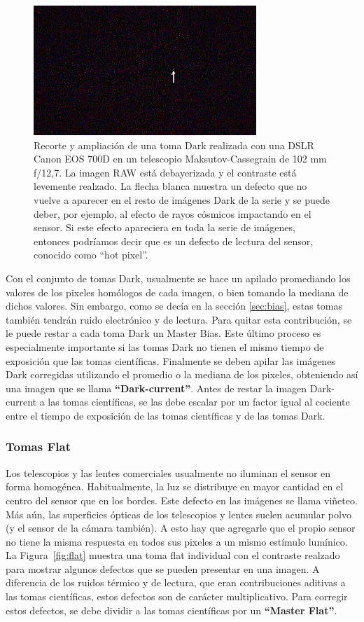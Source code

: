 \documentclass[a4paper, 12pt]{article}
\begin{document}
\begin{figure}[!ht]
  \centering
  \includegraphics[width=0.75\textwidth]{img/dark.png}
  \caption{\label{fig:dark} Recorte y ampliación de una toma Dark realizada con una DSLR Canon EOS 700D en un telescopio Maksutov-Cassegrain de 102 mm f/12,7. La imagen RAW está debayerizada y el contraste está levemente realzado. La flecha blanca muestra un defecto que no vuelve a aparecer en el resto de imágenes Dark de la serie y se puede deber, por ejemplo, al efecto de rayos cósmicos impactando en el sensor. Si este efecto apareciera en toda la serie de imágenes, entonces podríamos decir que es un defecto de lectura del sensor, conocido como ``hot pixel''.}
\end{figure}

Con el conjunto de tomas Dark, usualmente se hace un apilado promediando los valores de los pixeles homólogos de cada imagen, o bien tomando la mediana de dichos valores.  Sin embargo, como se decía en la sección \ref{sec:bias}, estas tomas también tendrán ruido electrónico y de lectura. Para quitar esta contribución, se le puede restar a cada toma Dark un Master Bias. Este último proceso es especialmente importante si las tomas Dark no tienen el mismo tiempo de exposición que las tomas científicas. Finalmente se deben apilar las imágenes Dark corregidas utilizando el promedio o la mediana de los pixeles, obteniendo así una imagen que se llama \textbf{``Dark-current''}. Antes de restar la imagen Dark-current a las tomas científicas, se las debe escalar por un factor igual al cociente entre el tiempo de exposición de las tomas científicas y de las tomas Dark.

\subsubsection{Tomas Flat}
Los telescopios y las lentes comerciales usualmente no iluminan el sensor en forma homogénea. Habitualmente, la luz se distribuye en mayor cantidad en el centro del sensor que en los bordes. Este defecto en las imágenes se llama viñeteo. Más aún, las superficies ópticas de los telescopios y lentes suelen acumular polvo (y el sensor de la cámara también). A esto hay que agregarle que el propio sensor no tiene la misma respuesta en todos sus pixeles a un mismo estímulo lumínico. 
La Figura~\ref{fig:flat} muestra una toma flat individual con el contraste realzado para mostrar algunos defectos que se pueden presentar en una imagen. A diferencia de los ruidos térmico y de lectura, que eran contribuciones aditivas a las tomas científicas, estos defectos son de carácter multiplicativo. Para corregir estos defectos, se debe dividir a las tomas científicas por un {\bf ``Master Flat''}.
\end{document}

